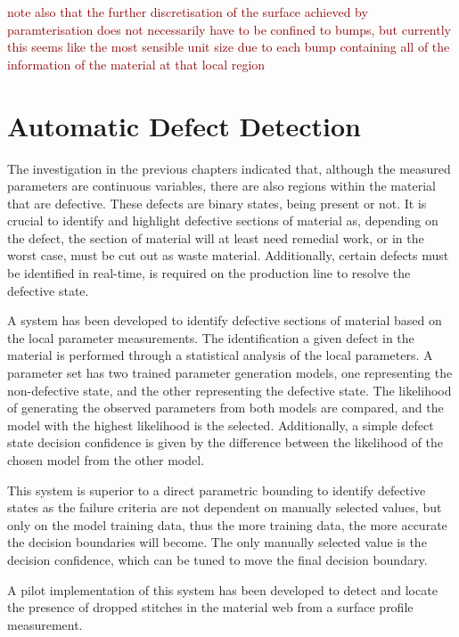 \documentclass[12pt]{report}
\newcommand{\tcr}[1]{\textcolor{darkRed}{#1}}
\begin{document}
        \tcr{note also that the further discretisation of the surface achieved by paramterisation does not necessarily have to be confined to bumps, but currently this seems like the most sensible unit size due to each bump containing all of the information of the material at that local region}
        



\chapter{Automatic Defect Detection}

The investigation in the previous chapters indicated that, although the measured parameters are continuous variables, there are also regions within the material that are defective. These defects are binary states, being present or not. It is crucial to identify and highlight defective sections of material as, depending on the defect, the section of material will at least need remedial work, or in the worst case, must be cut out as waste material. Additionally, certain defects must be identified in real-time, is required on the production line to resolve the defective state.

A system has been developed to identify defective sections of material based on the local parameter measurements. The identification a given defect in the material is performed through a statistical analysis of the local parameters. A parameter set has two trained parameter generation models, one representing the non-defective state, and the other representing the defective state. The likelihood of generating the observed parameters from both models are compared, and the model with the highest likelihood is the selected. Additionally, a simple defect state decision confidence is given by the difference between the likelihood of the chosen model from the other model. 

This system is superior to a direct parametric bounding to identify defective states as the failure criteria are not dependent on manually selected values, but only on the model training data, thus the more training data, the more accurate the decision boundaries will become. The only manually selected value is the decision confidence, which can be tuned to move the final decision boundary.

A pilot implementation of this system has been developed to detect and locate the presence of dropped stitches in the material web from a surface profile measurement.
\end{document}
